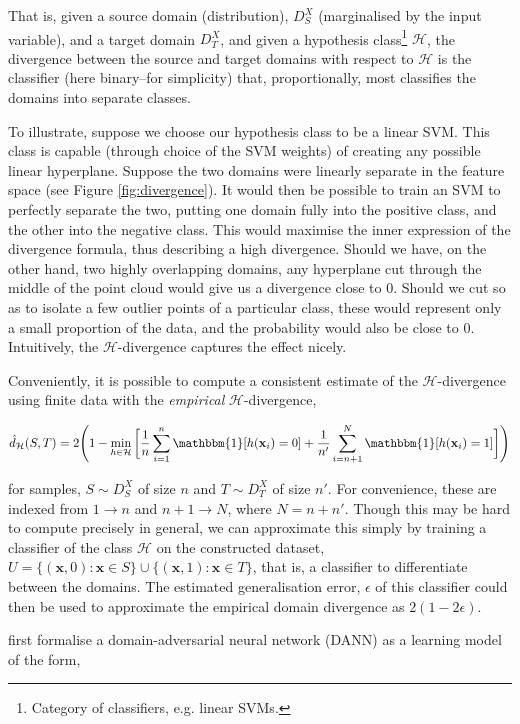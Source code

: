 That is, given a source domain (distribution), $D_S^X$ (marginalised by the input variable), and a target domain $D_T^X$, and given a hypothesis class\footnote{Category of classifiers, e.g. linear SVMs.} $\mathcal{H}$, the divergence between the source and target domains with respect to $\mathcal{H}$ is the classifier (here binary--for simplicity) that, proportionally, most classifies the domains into separate classes.

To illustrate, suppose we choose our hypothesis class to be a linear SVM. This class is capable (through choice of the SVM weights) of creating any possible linear hyperplane. Suppose the two domains were linearly separate in the feature space (see Figure \ref{fig:divergence}). It would then be possible to train an SVM to perfectly separate the two, putting one domain fully into the positive class, and the other into the negative class. This would maximise the inner expression of the divergence formula, thus describing a high divergence. Should we have, on the other hand, two highly overlapping domains, any hyperplane cut through the middle of the point cloud would give us a divergence close to 0. Should we cut so as to isolate a few outlier points of a particular class, these would represent only a small proportion of the data, and the probability would also be close to 0. Intuitively, the $\mathcal{H}$-divergence captures the effect nicely.

Conveniently, it is possible to compute a consistent estimate of the $\mathcal{H}$-divergence using finite data with the \emph{empirical} $\mathcal{H}$-divergence,

$$\hat{d}_\mathcal{H}(S, T) = 2\Bigg(1 - \min_{h \in \mathcal{H}}\bigg[\frac{1}{n}\sum_{i=1}^n\mathbbm{1}[h(\mathbf{x}_i) = 0] + \frac{1}{n'}\sum_{i=n+1}^N\mathbbm{1}[h(\mathbf{x}_i) = 1]\bigg]\Bigg)$$

for samples, $S \sim D_S^X$ of size $n$ and $T \sim D_T^X$ of size $n'$. For convenience, these are indexed from $1\to n$ and $n+1 \to N$, where $N = n + n'$. Though this may be hard to compute precisely in general, we can approximate this simply by training a classifier of the class $\mathcal{H}$ on the constructed dataset, $U = \{(\mathbf{x}, 0) : \mathbf{x} \in S\} \cup \{(\mathbf{x}, 1) : \mathbf{x} \in T\}$, that is, a classifier to differentiate between the domains. The estimated generalisation error, $\epsilon$ of this classifier could then be used to approximate the empirical domain divergence as $2(1 - 2\epsilon)$.

\cite{ajakan2014domain} first formalise a domain-adversarial neural network (DANN) as a learning model of the form,


